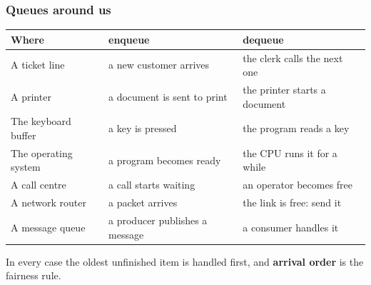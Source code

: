 \documentclass[aspectratio=169,10pt,compress]{beamer}
\begin{document}
\begin{frame}[t,fragile] \frametitle{Queues around us}
  \begin{center}\small
  \begin{tabular}{L{0.27\textwidth}L{0.29\textwidth}L{0.34\textwidth}}
    \toprule
    \textbf{Where}              & \textbf{enqueue}                        & \textbf{dequeue} \\
    \midrule
    A ticket line               & a new customer arrives                  & the clerk calls the next one \\
    A printer                   & a document is sent to print             & the printer starts a document \\
    The keyboard buffer         & a key is pressed                        & the program reads a key \\
    The operating system        & a program becomes ready                 & the CPU runs it for a while \\
    A call centre               & a call starts waiting                   & an operator becomes free \\
    A network router            & a packet arrives                        & the link is free: send it \\
    A message queue             & a producer publishes a message          & a consumer handles it \\
    \bottomrule
  \end{tabular}
  \end{center}
  \vspace{0.4em}
  In every case the oldest unfinished item is handled first, and \textbf{arrival order} is the fairness rule.
\end{frame}
\end{document}
